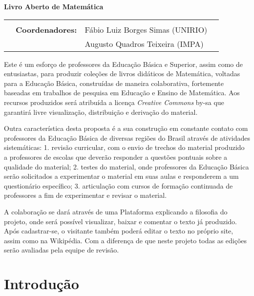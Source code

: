\documentclass[10 pt]{article}
\begin{document}

\begin{center}
{\Large{\bf   Livro Aberto de Matemática}}
 \end{center}

\begin{flushright}
  \noindent
  \begin{tabular}{llll}
    &&\\
    &\textbf{Coordenadores:}& Fábio Luiz Borges Simas (UNIRIO)\\
    & & Augusto Quadros Teixeira (IMPA)

  \end{tabular}

\end{flushright}
\vspace{0.3cm}

Este é um esforço de professores da Educação Básica e Superior, assim como de entusiastas, para produzir coleções de livros didáticos de Matemática, voltadas para a Educação Básica, construídas de maneira colaborativa, fortemente baseadas em trabalhos de pesquisa em Educação e Ensino de Matemática.
Aos recursos produzidos será atribuída a licença {\it Creative Commons} by-sa que garantirá livre visualização, distribuição e derivação do material. 

Outra característica desta proposta é a sua construção em constante contato com professores da Educação Básica de diversas regiões do Brasil através de atividades sistemáticas: 
1. revisão curricular, com o envio de trechos do material produzido a professores de escolas que deverão responder a questões pontuais sobre a qualidade do material; 
2. testes do material, onde professores da Educação Básica serão solicitados a experimentar o material em suas aulas e responderem a um questionário específico; 
3. articulação com cursos de formação continuada de professores a fim de experimentar e revisar o material.

A colaboração se dará através de uma Plataforma explicando a filosofia do projeto, onde será possível visualizar, baixar e comentar o texto já produzido.
Após cadastrar-se, o visitante também poderá editar o texto no próprio site, assim como na Wikipédia.
Com a diferença de que neste projeto todas as edições serão avaliadas pela equipe de revisão.

\section{Introdução}
\end{document}
